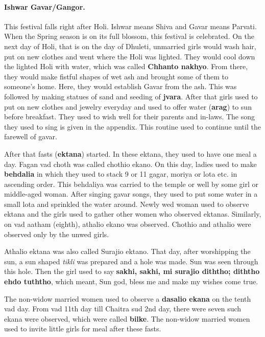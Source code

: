 \paragraph{Ishwar Gavar/Gangor.} This festival falls right after Holi. Ishwar
means Shiva and Gavar means Parvati. When the Spring season is on its full
blossom, this festival is celebrated. On the next day of Holi, that is on the
day of Dhuleti, unmarried girls would wash hair, put on new clothes and went
where the Holi was lighted. They would cool down the lighted Holi with water,
which was called \textbf{Chhanto nakhyo}. From there, they would make fistful
shapes of wet ash and brought some of them to someone's home. Here, they would establish
Gavar from the ash. This was followed by making statues of sand and seeding of
\textbf{jvara}.
After that girls used to put on new clothes and jewelry everyday and used to
offer water (\textbf{arag}) to sun before breakfast. They used to wish well for
their parents and in-laws. The song they used to sing is given in the appendix.
This routine used to continue until the farewell of gavar.

After that fasts (\textbf{ektana}) started. In these ektana, they used to have
one meal a day. Fagan vad choth was called chothio ekano. On this day, ladies
used to make \textbf{behdalia} in which they used to stack 9 or 11 gagar, moriya
or lota etc. in ascending order. This behdaliya was carried to the temple or
well by some girl or middle-aged woman. After singing gavar songs, they used to
put some water in a small lota and sprinkled the water around. Newly wed woman
used to observe ektana and the girls used to gather other women who observed
ektanas. Similarly, on vad aatham (eighth), athalio ekano was observed. Chothio
and athalio were observed only by the unwed girls.

Athalio ektana was also called Surajio ektano. That day, after worshipping the
sun, a sun shaped \textit{tikli} was prepared and a hole was made. Sun was seen
through this hole. Then the girl used to say \textbf{sakhi, sakhi, mi surajio
diththo; diththo ehdo tuththo}, which meant, Sun god, bless me and make my wishes
come true.

The non-widow married women used to observe a \textbf{dasalio ekana}
on the tenth vad day. From vad 11th day till Chaitra sud 2nd day, there were
seven such ekana were observed, which were called \textbf{bilke}. The non-widow
married women used to invite little girls for meal after these fasts.


